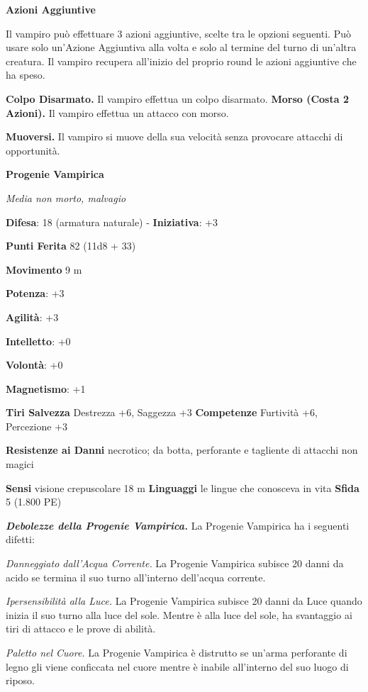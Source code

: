 \begin{multicols}{2}
\textbf{Azioni Aggiuntive}

Il vampiro può effettuare 3 azioni aggiuntive, scelte tra le opzioni
seguenti. Può usare solo un'Azione Aggiuntiva alla volta e solo al
termine del turno di un'altra creatura. Il vampiro recupera all'inizio
del proprio round le azioni aggiuntive che ha speso.

\textbf{Colpo Disarmato.} Il vampiro effettua un colpo disarmato.
\textbf{Morso (Costa 2 Azioni).} Il vampiro effettua un attacco con
morso.

\textbf{Muoversi.} Il vampiro si muove della sua velocità senza
provocare attacchi di opportunità.

\textbf{Progenie Vampirica}

\emph{Media non morto, malvagio}

\textbf{Difesa}: 18 (armatura naturale) - \textbf{Iniziativa}: +3

\textbf{Punti Ferita} 82 (11d8 + 33)

\textbf{Movimento} 9 m

\textbf{Potenza}: +3

\textbf{Agilità}: +3

\textbf{Intelletto}: +0

\textbf{Volontà}: +0

\textbf{Magnetismo}: +1

\textbf{Tiri Salvezza} Destrezza +6, Saggezza +3 \textbf{Competenze}
Furtività +6, Percezione +3

\textbf{Resistenze ai Danni} necrotico; da botta, perforante e
tagliente di attacchi non magici

\textbf{Sensi} visione crepuscolare 18 m
\textbf{Linguaggi} le lingue che conosceva in vita \textbf{Sfida} 5
(1.800 PE)\smallskip

\emph{\textbf{Debolezze della Progenie Vampirica.}} La Progenie
Vampirica ha i seguenti difetti:

\emph{Danneggiato dall'Acqua Corrente.} La Progenie Vampirica subisce 20
danni da acido se termina il suo turno all'interno dell'acqua corrente.

\emph{Ipersensibilità alla Luce.} La Progenie Vampirica subisce 20 danni da Luce quando inizia il suo turno alla luce del sole. Mentre è alla luce del sole, ha svantaggio ai tiri di attacco e le prove di abilità.

\emph{Paletto nel Cuore.} La Progenie Vampirica è distrutto se un'arma
perforante di legno gli viene conficcata nel cuore mentre è inabile
all'interno del suo luogo di riposo.


\end{multicols}
